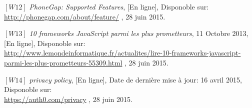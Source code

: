 \vspace{8pt}
\paragraphmark

\noindent $[W12]$ \hspace{2pt} \textit{PhoneGap: Supported Features}, [En ligne], Disponoble sur: \\
\scriptsize{\underline{http://phonegap.com/about/feature/}} \footnotesize, 28 juin 2015.

\vspace{8pt}
\paragraphmark

\noindent $[W13]$ \hspace{2pt} \textit{10 frameworks JavaScript parmi les plus prometteurs}, 11 Octobre 2013, [En ligne], Disponoble sur: \\
\scriptsize{\underline{http://www.lemondeinformatique.fr/actualites/lire-10-frameworks-javascript-parmi-les-plus-prometteurs-55309.html}} \footnotesize, 28 juin 2015.

\vspace{8pt}
\paragraphmark

\noindent $[W14]$ \hspace{2pt} \textit{privacy policy}, [En ligne], Date de dernière mise à jour: 16 avril 2015, Disponoble sur: \\
\scriptsize{\underline{https://auth0.com/privacy}} \footnotesize, 28 juin 2015.
